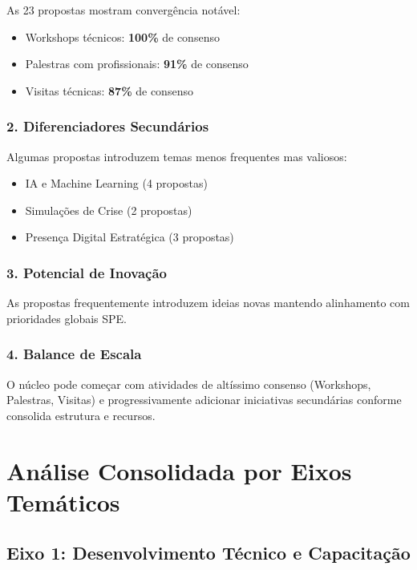 \documentclass[12pt,a4paper]{article}
\begin{document}
\begin{goldbox}
\small
As 23 propostas mostram convergência notável:
\begin{itemize}[topsep=2pt, itemsep=2pt]
    \item Workshops técnicos: \textbf{100\%} de consenso
    \item Palestras com profissionais: \textbf{91\%} de consenso
    \item Visitas técnicas: \textbf{87\%} de consenso
\end{itemize}
\end{goldbox}

\subsubsection*{2. Diferenciadores Secundários}
Algumas propostas introduzem temas menos frequentes mas valiosos:
\begin{itemize}
    \item IA e Machine Learning (4 propostas)
    \item Simulações de Crise (2 propostas)
    \item Presença Digital Estratégica (3 propostas)
\end{itemize}

\subsubsection*{3. Potencial de Inovação}
As propostas frequentemente introduzem ideias novas mantendo alinhamento com prioridades globais SPE.

\subsubsection*{4. Balance de Escala}
O núcleo pode começar com atividades de altíssimo consenso (Workshops, Palestras, Visitas) e progressivamente adicionar iniciativas secundárias conforme consolida estrutura e recursos.

\newpage
\section{Análise Consolidada por Eixos Temáticos}

\subsection{Eixo 1: Desenvolvimento Técnico e Capacitação}
\end{document}
